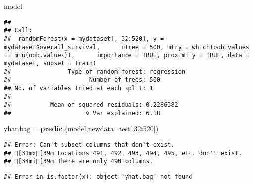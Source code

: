 \documentclass[
]{article}
\newenvironment{Shaded}{\begin{snugshade}}{\end{snugshade}}
\newcommand{\DataTypeTok}[1]{\textcolor[rgb]{0.13,0.29,0.53}{#1}}
\newcommand{\DecValTok}[1]{\textcolor[rgb]{0.00,0.00,0.81}{#1}}
\newcommand{\KeywordTok}[1]{\textcolor[rgb]{0.13,0.29,0.53}{\textbf{#1}}}
\newcommand{\NormalTok}[1]{#1}
\newcommand{\OperatorTok}[1]{\textcolor[rgb]{0.81,0.36,0.00}{\textbf{#1}}}
\newcommand{\StringTok}[1]{\textcolor[rgb]{0.31,0.60,0.02}{#1}}
\begin{document}
\begin{Shaded}
\begin{Highlighting}[]
\NormalTok{model}
\end{Highlighting}
\end{Shaded}

\begin{verbatim}
## 
## Call:
##  randomForest(x = mydataset[, 32:520], y = mydataset$overall_survival,      ntree = 500, mtry = which(oob.values == min(oob.values)),      importance = TRUE, proximity = TRUE, data = mydataset, subset = train) 
##                Type of random forest: regression
##                      Number of trees: 500
## No. of variables tried at each split: 1
## 
##           Mean of squared residuals: 0.2286382
##                     % Var explained: 6.18
\end{verbatim}

\begin{Shaded}
\begin{Highlighting}[]
\NormalTok{yhat.bag =}\StringTok{ }\KeywordTok{predict}\NormalTok{(model,}\DataTypeTok{newdata=}\NormalTok{test[,}\DecValTok{32}\OperatorTok{:}\DecValTok{520}\NormalTok{])}
\end{Highlighting}
\end{Shaded}

\begin{verbatim}
## Error: Can't subset columns that don't exist.
## [31mx[39m Locations 491, 492, 493, 494, 495, etc. don't exist.
## [34mi[39m There are only 490 columns.
\end{verbatim}

\begin{Shaded}
\end{Shaded}

\begin{verbatim}
## Error in is.factor(x): object 'yhat.bag' not found
\end{verbatim}

\begin{Shaded}
\end{Shaded}
\end{document}
